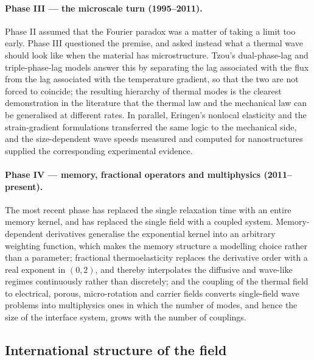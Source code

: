 \paragraph{Phase III --- the microscale turn (1995--2011).} Phase II assumed that the Fourier paradox was a matter of taking a limit too early. Phase III questioned the premise, and asked instead what a thermal wave should look like when the material has microstructure. Tzou's dual-phase-lag \cite{Tzou1995} and triple-phase-lag \cite{Tzou1997} models answer this by separating the lag associated with the flux from the lag associated with the temperature gradient, so that the two are not forced to coincide; the resulting hierarchy of thermal modes is the clearest demonstration in the literature that the thermal law and the mechanical law can be generalised at different rates. In parallel, Eringen's nonlocal elasticity \cite{Eringen1972,Eringen1974,Eringen1983} and the strain-gradient formulations \cite{Askes2006,Askes2011,Polizzotto2001} transferred the same logic to the mechanical side, and the size-dependent wave speeds measured and computed for nanostructures \cite{Maranganti2006,Maranganti2007} supplied the corresponding experimental evidence.

\paragraph{Phase IV --- memory, fractional operators and multiphysics (2011--present).} The most recent phase has replaced the single relaxation time with an entire memory kernel, and has replaced the single field with a coupled system. Memory-dependent derivatives \cite{Wang2011} generalise the exponential kernel into an arbitrary weighting function, which makes the memory structure a modelling choice rather than a parameter; fractional thermoelasticity \cite{Caputo1967,Gorenflo1997,Luchko2010,Povstenko2004,Povstenko2007,Povstenko2009,Povstenko2011,Povstenko2016} replaces the derivative order with a real exponent in $(0,2)$, and thereby interpolates the diffusive and wave-like regimes continuously rather than discretely; and the coupling of the thermal field to electrical, porous, micro-rotation and carrier fields \cite{Iesan1986,Iesan2013,Cowin1983,Nunziato1979,Chandrasekharaiah1996,Marotti2013,Sharma2022,Abouelregal2023} converts single-field wave problems into multiphysics ones in which the number of modes, and hence the size of the interface system, grows with the number of couplings.

\subsection{International structure of the field}

